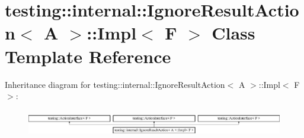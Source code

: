 \hypertarget{classtesting_1_1internal_1_1_ignore_result_action_1_1_impl}{}\section{testing\+::internal\+::Ignore\+Result\+Action$<$ A $>$\+::Impl$<$ F $>$ Class Template Reference}
\label{classtesting_1_1internal_1_1_ignore_result_action_1_1_impl}
Inheritance diagram for testing\+::internal\+::Ignore\+Result\+Action$<$ A $>$\+::Impl$<$ F $>$\+:\begin{figure}[H]
\begin{center}
\leavevmode
\includegraphics[height=1.208199cm]{dd/d50/classtesting_1_1internal_1_1_ignore_result_action_1_1_impl}
\end{center}
\end{figure}
